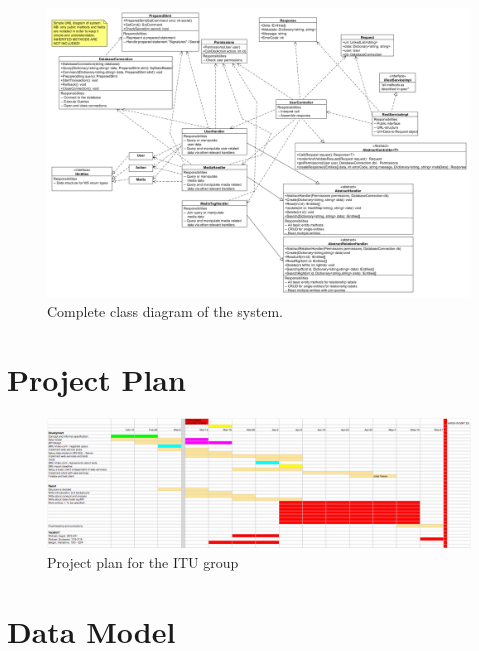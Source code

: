 \documentclass[11pt]{article}
\begin{document}
\begin{figure}[h!]
  \caption{Complete class diagram of the system.}
  \centering
    \includegraphics[width=1\textwidth, angle=270]{diagrams/class_diagram_final.png}
\end{figure}

\newpage

\section{Project Plan}

\begin{figure}[h!]
  \caption{Project plan for the ITU group}
  \centering
    \includegraphics[width=1\textwidth, angle=270]{images/project_plan.png}
\end{figure}

\newpage

\section{Data Model}
\end{document}
